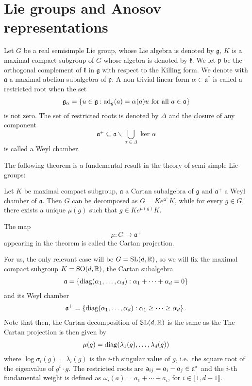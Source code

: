 \documentclass{report}
\begin{document}
\section{Lie groups and Anosov representations}\label{sec:lie_groups}
Let $G$ be a real semisimple Lie group, whose Lie algebra is denoted by $\mathfrak g$, $K$ is a maximal compact subgroup of $G$ whose algebra is denoted by $\mathfrak k$.
We let $\mathfrak p$ be the orthogonal complement of $\mathfrak k$ in $\mathfrak g$ with respect to the Killing form.
We denote with $\mathfrak a$ a maximal abelian subalgebra of $\mathfrak p$.
A non-trivial linear form $\alpha \in \mathfrak a^*$ is called a restricted root when the set
\[
\mathfrak g_\alpha = \left\{
    u \in \mathfrak g : \operatorname{ad}_g(a) = \alpha(a) u \text{ for all } a \in \mathfrak a
\right\}
\] 
is not zero.
The set of restricted roots is denoted by $\Delta$ and the closure of any component
\[
\mathfrak a^+ \subseteq \mathfrak a \backslash \bigcup_{\alpha \in \Delta} \ker \alpha
\]
is called a Weyl chamber.


The following theorem is a fundemental result in the theory of semi-simple Lie groups:
\begin{theorem}
Let $K$ be maximal compact subgroup, $\mathfrak a$ a Cartan subalgebra  of $\mathfrak g$ and $\mathfrak a^+$ a Weyl chamber of $\mathfrak a$.
Then $G$ can be decomposed as $G = K e^{\mathfrak a^+} K$, while for every $g \in G$, there exists a unique $\mu(g)$ such that $g \in K e^{\mu(g)} K$.    
\end{theorem}

The map
\[
\mu: G \to \mathfrak a^+
\] 
appearing in the theorem is called the Cartan projection.

For us, the only relevant case will be $G = \operatorname{{\mathrm{SL}}}(d, \mathbb R)$, so we will fix the maximal compact subgroup $K = \operatorname{{\mathrm{SO}}}(d, \mathbb R)$, the Cartan subalgebra
\[
    \mathfrak a = \left\{
        \operatorname{diag}(\alpha_1, \ldots, \alpha_d) : \alpha_1 + \cdots + \alpha_d = 0
    \right\}
\]
and its Weyl chamber
\[
    \mathfrak a^+ = \left\{
        \operatorname{diag}(\alpha_1, \ldots, \alpha_d) : \alpha_1 \geq \cdots \geq \alpha_d
    \right\}.
\]
Note that then, the Cartan decomposition of $\operatorname{{\mathrm{SL}}}(d, \mathbb R)$ is the same as the 
The Cartan projection is then given by
\[
\mu(g) = \operatorname{diag}(\lambda_1(g), \ldots, \lambda_d(g))
\]
where $\log \sigma_i(g) = \lambda_i(g)$ is the $i$-th singular value of $g$, i.e.\ the square root of the eigenvalue of $g^t \cdot g$.
The restricted roots are ${\sf a}_{ij} = a_i - a_j \in \mathfrak a^*$ and the $i$-th fundamental weight is defined as $\omega_{i}(a) = a_1 + \cdots + a_i$, for $i \in \llbracket 1, d - 1\rrbracket$.
\end{document}
